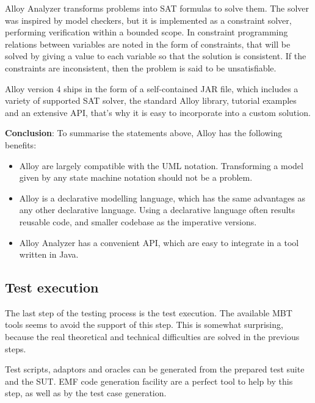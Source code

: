 Alloy Analyzer transforms problems into SAT formulas to solve them. The solver was inspired by model checkers, but it is implemented as a constraint solver, performing verification within a bounded scope. In constraint programming relations between variables are noted in the form of constraints, that will be solved by giving a value to each variable so that the solution is consistent. If the constraints are inconsistent, then the problem is said to be unsatisfiable.

Alloy version 4 ships in the form of a self-contained JAR file, which includes a variety of supported SAT solver, the standard Alloy library, tutorial examples and an extensive API, that's why it is easy to incorporate into a custom solution.

\textbf{Conclusion}: To summarise the statements above, Alloy has the following benefits:

\begin{itemize}
	\item Alloy are largely compatible with the UML notation. Transforming a model given by any state machine notation should not be a problem.
	\item Alloy is a declarative modelling language, which has the same advantages as any other declarative language. Using a declarative language often results reusable code, and smaller codebase as the imperative versions.
	\item Alloy Analyzer has a convenient API, which are easy to integrate in a tool written in Java.
\end{itemize}



\subsection{Test execution}
\label{sub:designtestgeneration}

\item The last step of the testing process is the test execution. The available MBT tools seems to avoid the support of this step. This is somewhat surprising, because the real theoretical and technical difficulties are solved in the previous steps.

Test scripts, adaptors and oracles can be generated from the prepared test suite and the SUT. EMF code generation facility are a perfect tool to help by this step, as well as by the test case generation.


